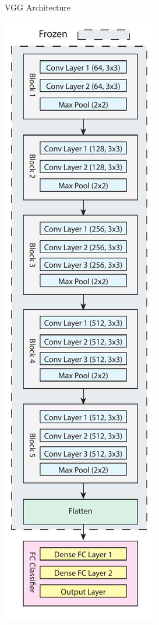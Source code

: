 \documentclass[a4paper, twocolumn]{article}
\begin{document}
\begin{figure}
\begin{subfigure}{0.16\textwidth}
		\caption{VGG Architecture}
		\label{fig:vgg}
	\end{subfigure}%
	\begin{subfigure}{0.16\textwidth}
		\includegraphics[width=\linewidth]{Figures/vgg_architecture_feature}

\end{subfigure}
\end{figure}
\end{document}
